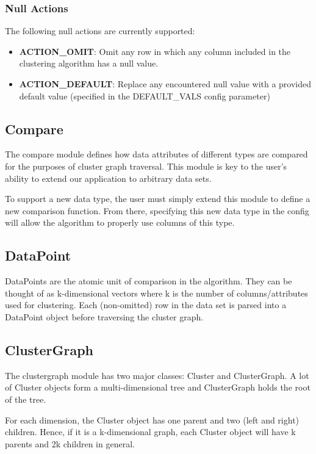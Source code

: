 \documentclass{article}
\begin{document}
\subsubsection{Null Actions}
\label{NullActions}

The following null actions are currently supported:

\begin{itemize}
    \item \textbf{ACTION\_OMIT}: Omit any row in which any column included in the clustering algorithm has a null value.
    \item \textbf{ACTION\_DEFAULT}: Replace any encountered null value with a provided default value (specified in the DEFAULT\_VALS config parameter)
\end{itemize}

\subsection{Compare}

The compare module defines how data attributes of different types are compared for the purposes of cluster graph traversal. This module is key to the user's ability to extend our application to arbitrary data sets.

To support a new data type, the user must simply extend this module to define a new comparison function. From there, specifying this new data type in the config will allow the algorithm to properly use columns of this type.

\subsection{DataPoint}

DataPoints are the atomic unit of comparison in the algorithm. They can be thought of as k-dimensional vectors where k is the number of columns/attributes used for clustering. Each (non-omitted) row in the data set is parsed into a DataPoint object before traversing the cluster graph.

\subsection{ClusterGraph}

The clustergraph module has two major classes: Cluster and ClusterGraph. A lot of Cluster objects form a multi-dimensional tree and ClusterGraph holds the root of the tree. 

For each dimension, the Cluster object has one parent and two (left and right) children. Hence, if it is a k-dimensional graph, each Cluster object will have k parents and 2k children in general.
\end{document}

